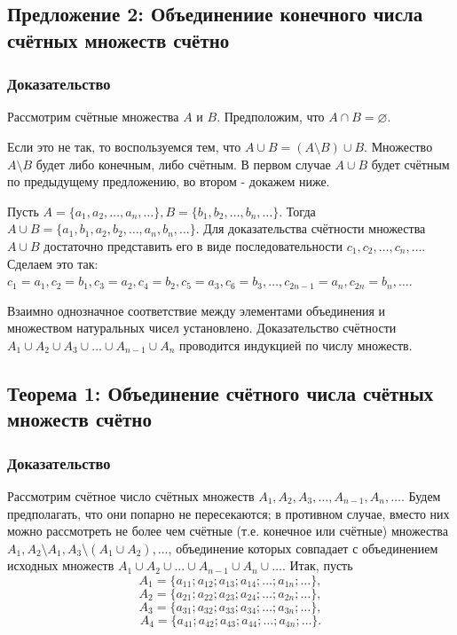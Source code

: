\documentclass{article}
\begin{document}
\subsection{Предложение 2: Объединениие конечного числа счётных множеств счётно}
\subsubsection*{Доказательство}

Рассмотрим счётные множества $A$ и $B$. Предположим, что $A \cap B = \varnothing$.

Если это не так, то воспользуемся тем, что $A \cup B = (A \setminus B) \cup B$. Множество $A \setminus B$ будет либо конечным, либо счётным. В первом случае $A \cup B$ будет счётным по предыдущему предложению, во втором - докажем ниже.

Пусть ${A = \{a_1, a_2, \dots, a_n, \dots \}}, {B = \{b_1, b_2, \dots, b_n, \dots\}}$. Тогда ${A \cup B = \{a_1, b_1, a_2, b_2, \dots, a_n, b_n, \dots\}}$. Для доказательства счётности множества $A \cup B$ достаточно представить его в виде последовательности $c_1, c_2, \dots, c_n, \dots$. Сделаем это так: $c_1 = a_1, c_2 = b_1, c_3 = a_2, c_4 = b_2, c_5 = a_3, c_6 = b_3, \dots, c_{2n-1} = a_n, c_{2n} = b_n, \dots$.

Взаимно однозначное соответствие между элементами объединения и множеством натуральных чисел установлено. Доказательство счётности $A_1 \cup A_2 \cup A_3 \cup \dots \cup A_{n-1} \cup A_n$ проводится индукцией по числу множеств.

\subsection{Теорема 1: Объединение счётного числа счётных множеств счётно}
\subsubsection*{Доказательство}
Рассмотрим счётное число счётных множеств $A_1, A_2, A_3, \dots, A_{n-1}, A_n, \dots$. Будем предполагать, что они попарно не пересекаются; в противном случае, вместо них можно рассмотреть не более чем счётные (т.е. конечное или счётные) множества ${A_1, A_2 \setminus A_1, A_3 \setminus (A_1 \cup A_2), \dots}$, объединение которых совпадает с объединением исходных множеств ${A_1 \cup A_2 \cup ... \cup A_{n-1} \cup A_n \cup \dots}$. Итак, пусть \[
	A_1 = \{a_{11}; a_{12}; a_{13}; a_{14}; \dots; a_{1n}; \dots \}, \]\[
	A_2 = \{a_{21}; a_{22}; a_{23}; a_{24}; \dots; a_{2n}; \dots \}, \]\[
	A_3 = \{a_{31}; a_{32}; a_{33}; a_{34}; \dots; a_{3n}; \dots \}, \]\[
	A_4 = \{a_{41}; a_{42}; a_{43}; a_{44}; \dots; a_{4n}; \dots \}.
\]	
\end{document}
